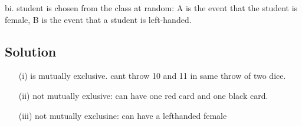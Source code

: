 bi.
student is chosen from the class at random: A is the event that the student is female, B is the event that a student is left-handed.









\subsection*{Solution}

\begin{itemize}
\item[(i)] is mutually exclusive. cant throw 10 and 11 in same throw of two dice.


\item[(ii)] not mutually exlusive: can have one red card and one black card.


\item[(iii)] not mutually exclusine: can have a lefthanded female
\end{itemize}


